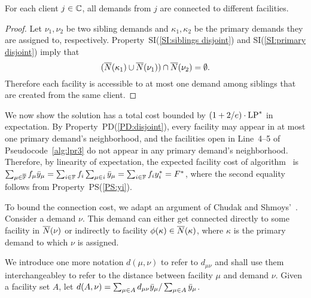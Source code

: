 \documentclass[11pt]{article}
\begin{document}

\begin{lemma}\label{lem: lpr3 feasible}
For each client $j\in\mathbb{C}$, all demands from $j$ are connected to
different facilities.
\end{lemma}


\begin{proof}
  Let $\nu_1,\nu_2$ be two sibling demands and
  $\kappa_1,\kappa_2$ be the primary demands they are
  assigned to, respectively.  Property~SI(\ref{SI:siblings
    disjoint}) and SI(\ref{SI:primary disjoint}) imply that
%
  \begin{equation*}
    ({\overline{N}}(\kappa_1) \cup {\overline{N}}(\nu_1)) \cap {\overline{N}}(\nu_2) = \emptyset.
  \end{equation*}
%
  Therefore each facility is accessible to at most one
  demand among siblings that are created from the same
  client.
\end{proof}


\medskip
We now show the solution has a total cost bounded by
$(1+2/e) \cdot \mbox{\rm LP}^\ast$ in expectation. By
Property~PD(\ref{PD:disjoint}), every facility may appear in at
most one primary demand's neighborhood, and the facilities
open in Line~4--5 of Pseudocode~\ref{alg:lpr3} do not appear
in any primary demand's neighborhood. Therefore, by
linearity of expectation, the expected facility cost of
algorithm~{\ECHU} is $\sum_{\mu\in\overline{\mathbb{F}}}
f_\mu {\bar y}_{\mu} = \sum_{i\in\mathbb{F}} f_i\sum_{\mu\in i}
{\bar y}_{\mu} = \sum_{i\in\mathbb{F}} f_i y_i^\ast = F^\ast$,
where the second equality follows from Property~PS(\ref{PS:yi}).

To bound the connection cost, we adapt an argument of Chudak
and Shmoys'~\cite{ChudakS04}. Consider a demand $\nu$. This
demand can either get connected directly to some facility in
${\overline{N}}(\nu)$ or indirectly to facility $\phi(\kappa)\in
{\overline{N}}(\kappa)$, where $\kappa$ is the primary demand to
which $\nu$ is assigned.

We introduce one more notation $d(\mu,\nu)$ to refer to
$d_{\mu\nu}$ and shall use them interchangeabley to refer to
the distance between facility $\mu$ and demand $\nu$. Given
a facility set $A$, let $d(A,\nu)=\sum_{\mu\in A}
d_{\mu\nu}{\bar y}_{\mu}/\sum_{\mu\in A} {\bar y}_{\mu}$.
\end{document}
